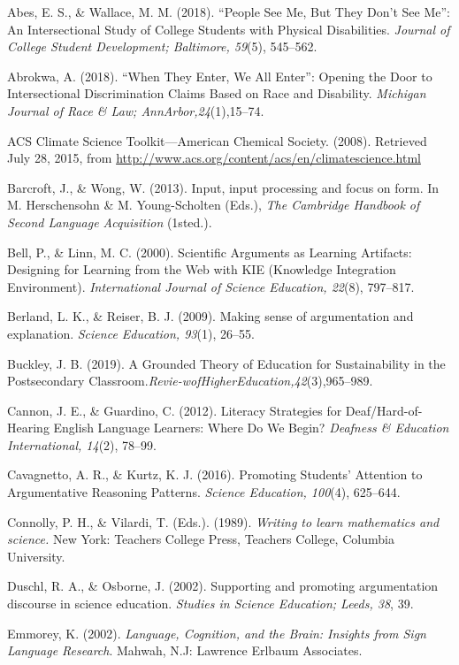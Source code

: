 \documentclass[11.5pt]{sig-alternate} %
\begin{document}
\begin{hangparas}{0.25in}{1}

Abes, E. S., \& Wallace, M. M. (2018). “People See Me, But They Don’t See Me”: An Intersectional Study of College Students with Physical Disabilities. \textit{Journal of College Student Development; Baltimore, 59}(5), 545–562. 

Abrokwa, A. (2018). “When They Enter, We All Enter”: Opening the Door to Intersectional Discrimination Claims Based on Race and Disability. \textit{Michigan Journal of Race \& Law; AnnArbor,24}(1),15–74.

ACS Climate Science Toolkit—American Chemical Society. (2008). Retrieved July 28, 2015, from \url{http://www.acs.org/content/acs/en/climatescience.html}

Barcroft, J., \& Wong, W. (2013). Input, input processing and focus on form. In M. Herschensohn \& M. Young-Scholten (Eds.), \textit{The Cambridge Handbook of Second Language Acquisition} (1sted.).

Bell, P., \& Linn, M. C. (2000). Scientific Arguments as Learning Artifacts: Designing for Learning from the Web with KIE (Knowledge Integration Environment). \textit{International Journal of Science Education, 22}(8), 797–817.

Berland, L. K., \& Reiser, B. J. (2009). Making sense of argumentation and explanation. \textit{Science Education, 93}(1), 26–55.

Buckley, J. B. (2019). A Grounded Theory of Education for Sustainability in the Postsecondary Classroom.\textit{Revie-wofHigherEducation,42}(3),965–989. 

Cannon, J. E., \& Guardino, C. (2012). Literacy Strategies for Deaf/Hard-of-Hearing English Language Learners: Where Do We Begin? \textit{Deafness \& Education International, 14}(2), 78–99. 

Cavagnetto, A. R., \& Kurtz, K. J. (2016). Promoting Students’ Attention to Argumentative Reasoning Patterns. \textit{Science Education, 100}(4), 625–644.

Connolly, P. H., \& Vilardi, T. (Eds.). (1989). \textit{Writing to learn mathematics and science.} New York: Teachers College Press, Teachers College, Columbia University.

Duschl, R. A., \& Osborne, J. (2002). Supporting and promoting argumentation discourse in science education. \textit{Studies in Science Education; Leeds, 38}, 39. 

Emmorey, K. (2002). \textit{Language, Cognition, and the Brain: Insights from Sign Language Research}. Mahwah, N.J: Lawrence Erlbaum Associates.


\end{hangparas}
\end{document}
